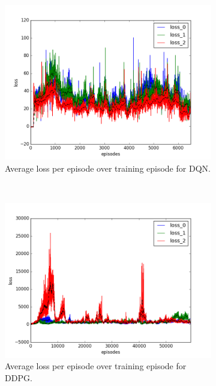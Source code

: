 \begin{figure}[h]
  \begin{subfigure}[h]{\figscale\linewidth}
    \includegraphics[trim=10 10 10 10,clip,width=\linewidth]
    {../results/dqn_1vs2/loss.png}
    \caption{Average loss per episode over training episode for DQN.}
    \label{fig:dqn-1vs2-loss}
  \end{subfigure}
  ~
  \begin{subfigure}[h]{\figscale\linewidth}
    \includegraphics[trim=10 10 10 10,clip,width=\linewidth]
    {../results/ddpg_1vs2/loss.png}
    \caption{Average loss per episode over training episode for DDPG.}
    \label{fig:ddpg-1vs2-loss}
  \end{subfigure}
  ~
  \begin{subfigure}[h]{\figscale\linewidth}

\end{subfigure}
\end{figure}
